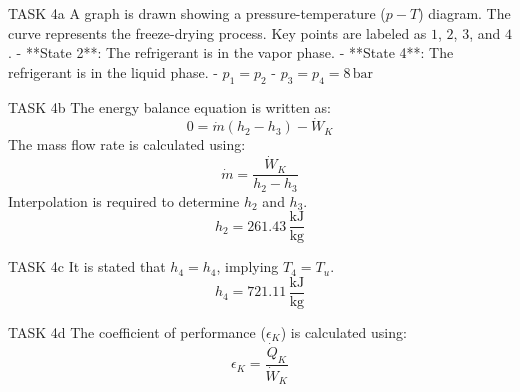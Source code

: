 TASK 4a  
A graph is drawn showing a pressure-temperature (\(p-T\)) diagram. The curve represents the freeze-drying process. Key points are labeled as \(1\), \(2\), \(3\), and \(4\).  
- **State 2**: The refrigerant is in the vapor phase.  
- **State 4**: The refrigerant is in the liquid phase.  
- \(p_1 = p_2\)  
- \(p_3 = p_4 = 8 \, \text{bar}\)  

TASK 4b  
The energy balance equation is written as:  
\[
0 = \dot{m} (h_2 - h_3) - \dot{W}_K
\]  
The mass flow rate is calculated using:  
\[
\dot{m} = \frac{\dot{W}_K}{h_2 - h_3}
\]  
Interpolation is required to determine \(h_2\) and \(h_3\).  
\[
h_2 = 261.43 \, \frac{\text{kJ}}{\text{kg}}
\]  

TASK 4c  
It is stated that \(h_4 = h_4\), implying \(T_4 = T_u\).  
\[
h_4 = 721.11 \, \frac{\text{kJ}}{\text{kg}}
\]  

TASK 4d  
The coefficient of performance (\(\epsilon_K\)) is calculated using:  
\[
\epsilon_K = \frac{\dot{Q}_K}{\dot{W}_K}
\]  